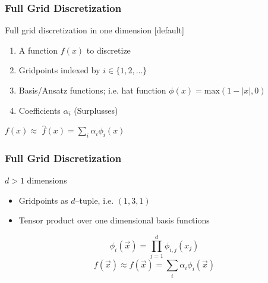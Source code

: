 \begin{frame}
  \frametitle{Full Grid Discretization}
  \topline
  \vspace{-10px}
  \begin{block}{Full grid discretization in one dimension}
    [default]
    \begin{enumerate}
    \item A function $f(x)$ to discretize
    \item Gridpoints indexed by $i \in \{1,2,\dots\}$
    \item Basis/Ansatz functions; i.e. hat function $\phi(x)=\text{max}(1 - |x|, 0)$
    \item Coefficients $\alpha_i$ (Surplusses)
    \end{enumerate}
    \vspace{10px}
    \begin{center}
      $f(x) \approx$ $\hat{f}(x) = \sum_{i}^{}{\alpha_i \phi_i(x)}$
    \end{center}
  \end{block}
\end{frame}

\begin{frame}
  \frametitle{Full Grid Discretization}
  \topline
  \vspace{-10px}
  \begin{block}{$d > 1$ dimensions}
    \begin{itemize}
      \item Gridpoints as $d$--tuple, i.e. $(1,3,1)$
      \item Tensor product over one dimensional basis functions
    \end{itemize}
    \begin{center}
      $$ \phi_i(\vec{x}) = \prod_{j=1}^d{\phi_{i,j}(x_j)}$$
      $$ f(\vec{x}) \approx \hat{f}(\vec{x}) =
      \sum_i{\alpha_i\phi_i(\vec{x})}$$
    \end{center}
  \end{block}
\end{frame}

